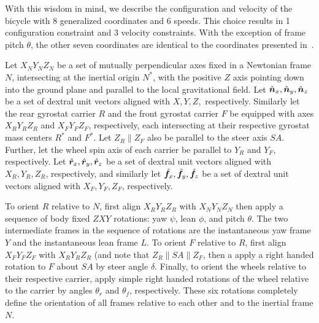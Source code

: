 With this wisdom in mind, we describe the configuration and velocity of the
bicycle with 8 generalized coordinates and 6 speeds. This choice results in 1
configuration constraint and 3 velocity constraints. With the exception of
frame pitch $\theta$, the other seven coordinates are identical to the
coordinates presented in~\cite{Meijaard2007}.

Let $X_NY_NZ_N$ be a set of mutually perpendicular axes fixed in a Newtonian
frame $N$, intersecting at the inertial origin $N^*$, with the positive $Z$
axis pointing down into the ground plane and parallel to the local
gravitational field. Let $\hat{\boldsymbol{n}}_{x}, \hat{\boldsymbol{n}}_{y}, \hat{\boldsymbol{n}}_{z}$ be a set of dextral
unit vectors aligned with $X, Y, Z,$ respectively. Similarly let the rear
gyrostat carrier $R$ and the front gyrostat carrier $F$ be equipped with axes
$X_RY_RZ_R$ and $X_FY_FZ_F$, respectively, each intersecting at their
respective gyrostat mass centers $R^*$ and $F^*$. Let $Z_R \parallel Z_F$ also
be parallel to the steer axis $SA$. Further, let the wheel spin axis of each
carrier be parallel to $Y_R$ and $Y_F$, respectively. Let $\hat{\boldsymbol{r}}_{x},
\hat{\boldsymbol{r}}_{y}, \hat{\boldsymbol{r}}_{z}$ be a set of dextral unit vectors aligned with $X_R, Y_R,
Z_R$, respectively, and similarly let $\hat{\boldsymbol{f}}_{x}, \hat{\boldsymbol{f}}_{y}, \hat{\boldsymbol{f}}_{z}$ be a
set of dextral unit vectors aligned with $X_F, Y_F, Z_F$, respectively.

To orient $R$ relative to $N$, first align $X_RY_RZ_R$ with $X_NY_NZ_N$ then
apply a sequence of body fixed $ZXY$ rotations: yaw $\psi$, lean $\phi$, and
pitch $\theta$. The two intermediate frames in the sequence of rotations are
the instantaneous yaw frame $Y$ and the instantaneous lean frame $L$. To orient
$F$ relative to $R$, first align $X_FY_FZ_F$ with $X_RY_RZ_R$ (and note that
$Z_R \parallel SA \parallel Z_F$, then a apply a right handed rotation to $F$
about $SA$ by steer angle $\delta$. Finally, to orient the wheels relative to
their respective carrier, apply simple right handed rotations of the wheel
relative to the carrier by angles $\theta_r$ and $\theta_f$, respectively.
These six rotations completely define the orientation of all frames relative to
each other and to the inertial frame $N$.

